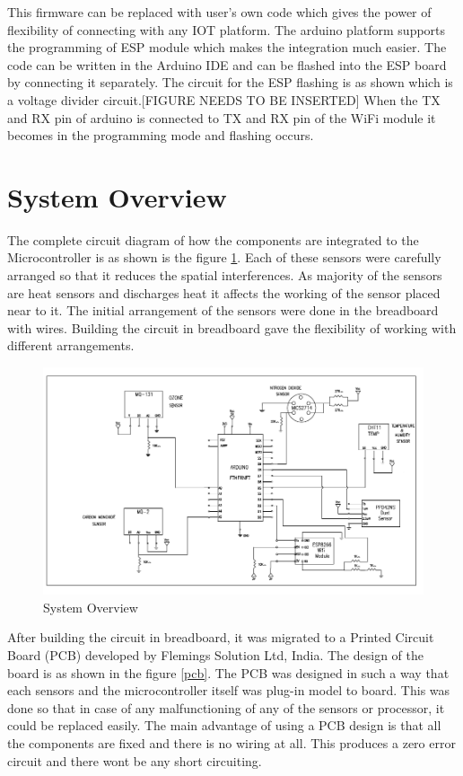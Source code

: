 \documentclass[12pt,a4paper,oneside]{report}
\begin{document}
 This firmware can be replaced with user's own code which gives the power of flexibility of connecting with any IOT platform. The arduino platform supports the programming of ESP module which makes the integration much easier. The code can be written in the Arduino IDE and can be flashed into the ESP board by connecting it separately.
 The circuit for the ESP flashing is as shown which is a voltage divider circuit.[FIGURE NEEDS TO BE INSERTED] When the TX and RX pin of arduino is connected to TX and RX pin of the WiFi module it becomes in the programming mode and flashing occurs. 
 
 \section*{System Overview}
The complete circuit diagram of how the components are integrated to the Microcontroller is as shown is the figure \ref{system}. Each of these sensors were carefully arranged so that it reduces the spatial interferences. As majority of the sensors are heat sensors and discharges heat it affects the working of the sensor placed near to it. The initial arrangement of the sensors were done in the breadboard with wires. Building the circuit in breadboard gave the flexibility of working with different arrangements.

 \begin{figure}[h]
  \begin{center}
  \includegraphics[scale=0.95]{images/figure5.png}
  \end{center}
  \caption{System Overview}
  \label{system}
\end{figure}

After building the circuit in breadboard, it was migrated to a Printed Circuit Board (PCB) developed by Flemings Solution Ltd, India. The design of the board is as shown in the figure \ref{pcb}. The PCB was designed in such a way that each sensors and the microcontroller itself was plug-in model to board. This was done so that in case of any malfunctioning of any of the sensors or processor, it could be replaced easily. The main advantage of using a PCB design is that all the components are fixed and there is no wiring at all. This produces a zero error circuit and there wont be any short circuiting.
\end{document}
